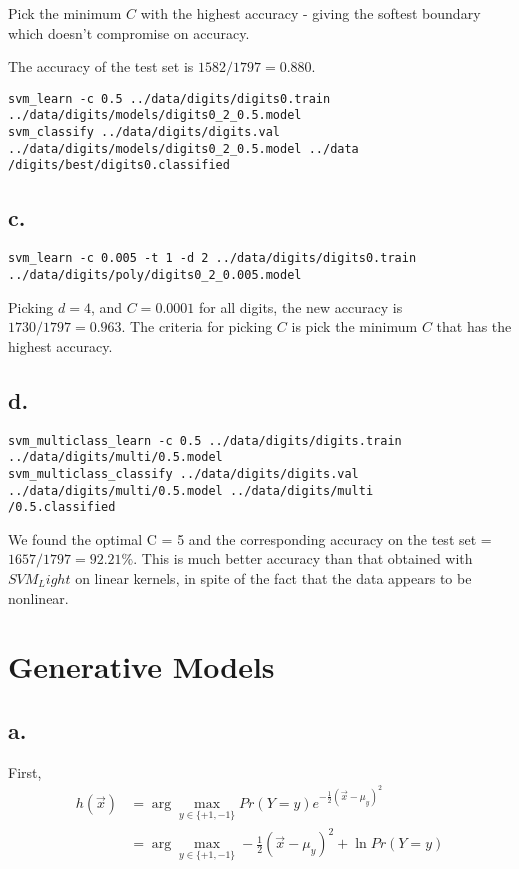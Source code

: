 \documentclass[]{article}
\begin{document}
Pick the minimum $C$ with the highest accuracy - giving the softest boundary which doesn't compromise on accuracy.

The accuracy of the test set is $1582/1797 = 0.880$.

\begin{verbatim}
svm_learn -c 0.5 ../data/digits/digits0.train ../data/digits/models/digits0_2_0.5.model
svm_classify ../data/digits/digits.val ../data/digits/models/digits0_2_0.5.model ../data
/digits/best/digits0.classified
\end{verbatim}

\subsection*{c.}
\begin{verbatim}
svm_learn -c 0.005 -t 1 -d 2 ../data/digits/digits0.train ../data/digits/poly/digits0_2_0.005.model
\end{verbatim}
Picking $d=4$, and $C = 0.0001$ for all digits, the new accuracy is $1730/1797 = 0.963$. The criteria for picking $C$ is pick the minimum $C$ that has the highest accuracy.

\subsection*{d.}
\begin{verbatim}
svm_multiclass_learn -c 0.5 ../data/digits/digits.train ../data/digits/multi/0.5.model
svm_multiclass_classify ../data/digits/digits.val ../data/digits/multi/0.5.model ../data/digits/multi
/0.5.classified
\end{verbatim}

We found the optimal C = 5 and the corresponding accuracy on the test set = $1657/1797 = 92.21\%$. This is much better accuracy than that obtained with $SVM_Light$ on linear kernels, in spite of the fact that the data appears to be nonlinear.

\section{Generative Models}

\subsection*{a.}
First,
\begin{align*}
h(\vec x) &= \arg \max_{y \in \{+1,-1\}} Pr(Y=y)e^{-\frac{1}{2}(\vec x - \mu_{y})^2} \\
&= \arg \max_{y \in \{+1,-1\}} -\frac{1}{2}(\vec x - \mu_y)^2 + \ln Pr(Y=y)
\end{align*}
\end{document}

